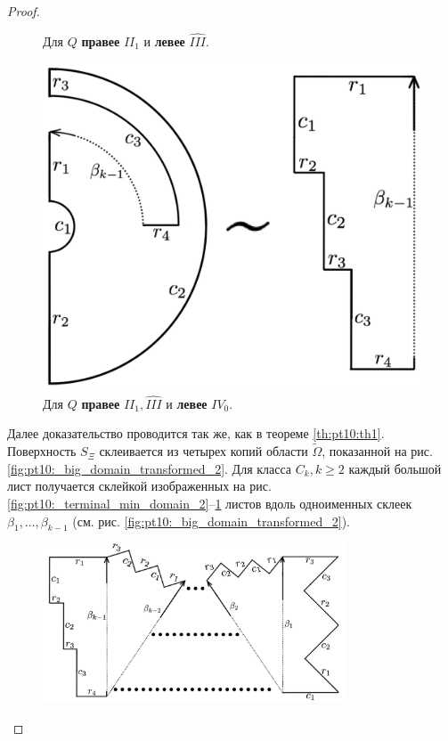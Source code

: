 \begin{proof}
\begin{figure}[!htb]
    \caption{Для $Q$ \textbf{правее} $II_1$ и \textbf{левее} $\widehat{III}$.}
    \label{fig:pt10:_branching_domain_2}
\endminipage\hfill
{}
\centering
\includegraphics[scale=0.1]{images/ch4/section3_circular/atoms/branching/terminal_max_transformed_2.pdf}
    \caption{Для $Q$ \textbf{правее} $II_1, \widehat{III}$ и \textbf{левее} $IV_0$.}
    \label{fig:pt10:_terminal_max_domain_2}
\endminipage\hfill
\end{figure}

Далее доказательство проводится так же, как в теореме \ref{th:pt10:th1}. Поверхность $S_\Xi$ склеивается из четырех копий области $\widetilde{\Omega}$, показанной на рис. \ref{fig:pt10:_big_domain_transformed_2}. 
Для класса $C_k, k \geq 2$ каждый большой лист получается склейкой изображенных на рис. \ref{fig:pt10:_terminal_min_domain_2}--\ref{fig:pt10:_terminal_max_domain_2} листов вдоль одноименных склеек $\beta_1, \ldots, \beta_{k-1}$ (см. рис. \ref{fig:pt10:_big_domain_transformed_2}).

\begin{figure}[!htb]
\centering
\includegraphics[width=9cm]{images/ch4/section3_circular/atoms/branching/big_domain_transformed_2.pdf}
    \caption{}


\end{figure}
\end{proof}
